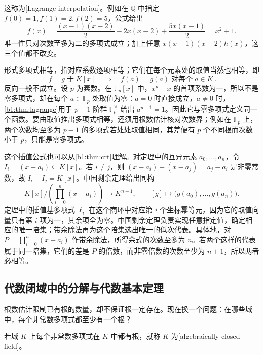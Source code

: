 这称为[Lagrange interpolation]。例如在 \(\mathbb Q\) 中指定 \(f(0)=1,f(1)=2,f(2)=5\)，公式给出
\[
	f(x)=\frac{(x-1)(x-2)}2-2x(x-2)+\frac{5x(x-1)}2=x^2+1.
\]
唯一性只对次数至多为二的多项式成立；加上任意 \(x(x-1)(x-2)h(x)\)，这三个值都不改变。

\ProseParagraphBreak
{}\label{b1:note:polynomial-function-distinction}
形式多项式相等，指对应系数逐项相等；它们在每个元素处的取值当然也相等，即
\[
	\boxed{\ f=g\;\text{于}\;K[x]\quad\Longrightarrow\quad f(a)=g(a)\;\text{对每个}\;a\in K\ }.
\]
反向一般不成立。设 \(p\) 为素数。在 \(\mathbb F_p[x]\) 中，\(x^p-x\) 的首项系数为一，所以不是零多项式，却在每个 \(a\in\mathbb F_p\) 处取值为零：\(a=0\) 时直接成立，\(a\ne0\) 时，\cref{b1:thm:lagrange}用于 \(p-1\) 阶群 \(\mathbb F_p^\times\) 给出 \(a^{p-1}=1\)。因此它与零多项式定义同一个函数。要由取值推出多项式相等，还须用根数估计核对次数界；例如在 \(\mathbb F_p\) 上，两个次数均至多为 \(p-1\) 的多项式若处处取值相同，其差便有 \(p\) 个不同根而次数小于 \(p\)，只能是零多项式。

\ProseParagraphBreak
这个插值公式也可以从\cref{b1:thm:crt}理解。对定理中的互异元素 \(a_0,\ldots,a_n\)，令 \(I_i=(x-a_i)\subseteq K[x]\)。若 \(i\ne j\)，则 \((x-a_i)-(x-a_j)=a_j-a_i\) 是非零常数，故 \(I_i+I_j=K[x]\)。中国剩余定理给出同构
\[
	K[x]\Big/\left(\prod_{i=0}^n(x-a_i)\right) \longrightarrow K^{n+1},\qquad [g]\longmapsto\bigl(g(a_0),\ldots,g(a_n)\bigr).
\]
定理中的插值基多项式 \(\ell_i\) 在这个商环中对应第 \(i\) 个坐标幂等元，因为它的取值向量只有第 \(i\) 项为一，其余项全为零。中国剩余定理负责实现任意指定值，确定相应的唯一陪集；带余除法再为这个陪集选出唯一的低次代表。具体地，对 \(P=\prod_{i=0}^n(x-a_i)\) 作带余除法，所得余式的次数至多为 \(n\)。若两个这样的代表属于同一陪集，它们的差是 \(P\) 的倍数，而非零倍数的次数至少为 \(n+1\)，所以两者必相等。

\subsection{代数闭域中的分解与代数基本定理}
\label{b1:subsec:1201:04}

根数估计限制已有根的数量，却不保证根一定存在。现在换一个问题：在哪些域中，每个非常数多项式都至少有一个根？

\begin{definition}\label{b1:def:algebraically-closed}
	若域 \(K\) 上每个非常数多项式在 \(K\) 中都有根，就称 \(K\) 为[algebraically closed field]。
\end{definition}

